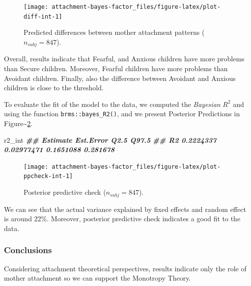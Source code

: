 \documentclass[
]{book}
\newenvironment{Shaded}{\begin{snugshade}}{\end{snugshade}}
\newcommand{\DocumentationTok}[1]{\textcolor[rgb]{0.56,0.35,0.01}{\textbf{\textit{#1}}}}
\newcommand{\NormalTok}[1]{#1}
\begin{document}
\begin{figure}

{\centering \texttt{[image: attachment-bayes-factor\_files/figure-latex/plot-diff-int-1]} 

}

\caption{Predicted differences between mother attachment patterns ($n_{subj} = 847$).}\label{fig:plot-diff-int}
\end{figure}

Overall, results indicate that Fearful, and Anxious children have more problems than Secure children. Moreover, Fearful children have more problems than Avoidant children. Finally, also the difference between Avoidant and Anxious children is close to the threshold.

To evaluate the fit of the model to the data, we computed the \emph{Bayesian} \(R^2\) and using the function \texttt{brms::bayes\_R2()}, and we present Posterior Predictions in Figure\textasciitilde\ref{fig:plot-ppcheck-int}.

\begin{Shaded}
\begin{Highlighting}[]
\NormalTok{r2\_int}
\DocumentationTok{\#\#     Estimate  Est.Error      Q2.5    Q97.5}
\DocumentationTok{\#\# R2 0.2224337 0.02977471 0.1651088 0.281678}
\end{Highlighting}
\end{Shaded}

\begin{figure}

{\centering \texttt{[image: attachment-bayes-factor\_files/figure-latex/plot-ppcheck-int-1]} 

}

\caption{Posterior predictive check ($n_{subj} = 847$).}\label{fig:plot-ppcheck-int}
\end{figure}

We can see that the actual variance explained by fixed effects and random effect is around 22\%. Moreover, posterior predictive check indicates a good fit to the data.

\hypertarget{conclusions-5}{%
\subsubsection*{Conclusions}\label{conclusions-5}}

Considering attachment theoretical perspectives, results indicate only the role of mother attachment so we can support the Monotropy Theory.
\end{document}
